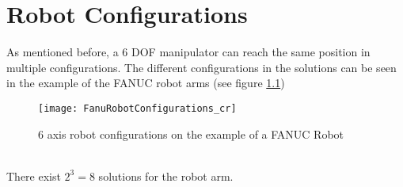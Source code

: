 \chapter{Robot Configurations} \label{sec:RobConf}

As mentioned before, a 6 \ac{DOF} manipulator can reach the same position in multiple configurations.
The different configurations in the solutions can be seen in the example of the FANUC robot arms (see figure \ref{fig:RobotConfigs})
\medskip

\begin{figure}[H]
	\texttt{[image: FanuRobotConfigurations\_cr]}
	\caption{6 axis robot configurations on the example of a FANUC Robot \cite{QingFanucAcademy}}
	\label{fig:RobotConfigs}
\end{figure}
\phantom{}\\
There exist $2^3=8$ solutions for the robot arm.

\phantom{}\\

